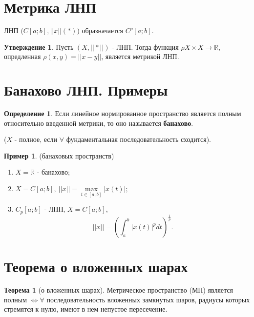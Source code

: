 \documentclass{report}
\theoremstyle{definition}
\newtheorem*{definition}{Определение}
\newtheorem*{example}{Пример}
\newtheorem*{statement}{Утверждение}
\newtheorem*{theorem}{Теорема}
\begin{document}
\section{Метрика ЛНП}

ЛНП ($C[a;b], || x || (*)$) образначается $C^p[a;b]$.

\begin{statement}
    Пусть $(X,|| * ||)$ - ЛНП. Тогда функция $\rho X \times X \rightarrow \mathbb{R}$, опредленная $\rho(x,y)
        = || x-y ||$, является метрикой ЛНП.
\end{statement}

\section{Банахово ЛНП. Примеры}

\begin{definition}
    Если линейное нормированное пространство является полным относительно введенной метрики, то оно называется
    \textbf{банахово}.

    ($X$ - полное, если $\forall$ фундаментальная последовательность сходится).
\end{definition}

\begin{example}
    (банаховых пространств)

    \begin{enumerate}
        \item $X = \mathbb{R}$ - банахово;
        \item $X = C[a;b], \ ||x|| = \underset{t \in [a;b]}{\max}|x(t)|$;
        \item $C_p[a;b]$ - ЛНП, $X = C[a;b]$,
              \begin{equation*}
                  ||x|| = (\int_{a}^{b}|x(t)|^p dt)^\frac{1}{p}.
              \end{equation*}
    \end{enumerate}
\end{example}

\section{Теорема о вложенных шарах}

\begin{theorem}[о вложенных шарах]
    Метрическое пространство (МП) является полным $\iff \forall$ последовательность вложенных замкнутых шаров,
    радиусы которых стремятся к нулю, имеют в нем непустое пересечение.
\end{theorem}
\end{document}
